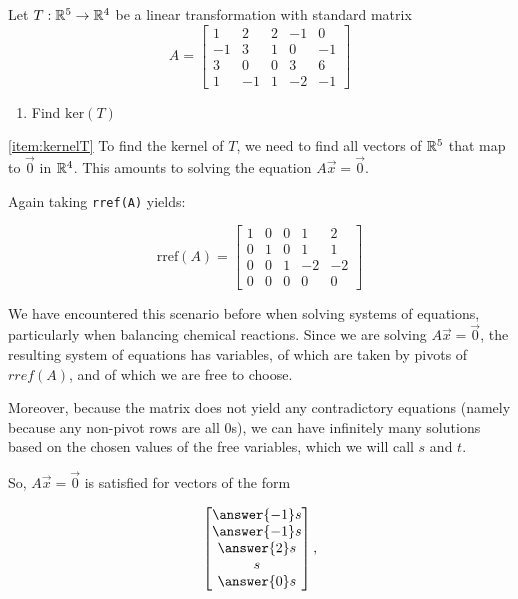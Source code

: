 \documentclass{ximera}
\begin{document}
\begin{center}
  \youtube{}
\end{center}
 
\begin{example}\label{ex:kernel} Let $T:\mathbb{R}^5\rightarrow \mathbb{R}^4$ be a linear transformation with standard matrix $$A=\begin{bmatrix}1 & 2 & 2 &-1 & 0\\-1 & 3 & 1 & 0 & -1\\3 & 0 & 0 & 3 & 6\\ 1 & -1 & 1 & -2 & -1\end{bmatrix}$$
\begin{enumerate}
\item \label{item:kernelT}
Find $\mbox{ker}(T)$
\end{enumerate}
\begin{explanation}
\ref{item:kernelT} To find the kernel of $T$, we need to find all vectors of $\mathbb{R}^5$ that map to $\vec{0}$ in $\mathbb{R}^4$.  This amounts to solving the equation $A\vec{x}=\vec{0}$.
 
Again taking \texttt{rref(A)} yields:
 
$$\mbox{rref}(A)= \begin{bmatrix} 1 & 0 & 0 & 1 & 2\\0 & 1 & 0 & 1 & 1\\0 & 0 & 1 & -2 & -2\\ 0 & 0 & 0 & 0 & 0 \end{bmatrix}$$
 
We have encountered this scenario before when solving systems of equations, particularly when balancing chemical reactions. Since we are solving $A\vec{x}=\vec{0}$, the resulting system of equations has  variables,  of which are taken by pivots of $rref(A)$, and  of which we are free to choose. 

Moreover, because the matrix does not yield any contradictory equations (namely because any non-pivot rows are all $0$s), we can have infinitely many solutions based on the chosen values of the free variables, which we will call $s$ and $t$.

So, $A\vec{x}=\vec{0}$ is satisfied for vectors of the form 

$$\begin{bmatrix}\answer{-1}s\\\answer{-1}s\\\answer{2}s\\s\\\answer{0}s\end{bmatrix},$$


\end{explanation}
\end{example}
\end{document}
